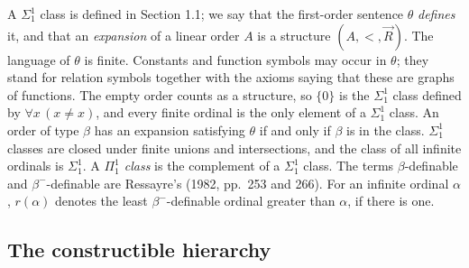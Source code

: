 \documentclass[11pt]{article}
\begin{document}
A $\Sigma^1_1$ class is defined in Section 1.1; we say that the first-order sentence $\theta$ \emph{defines} it, and
that an \emph{expansion} of a linear order $A$ is a structure $(A, <, \vec R)$. The language of $\theta$ is finite.
Constants and function symbols may occur in $\theta$; they stand for relation symbols together with the axioms saying
that these are graphs of functions. The empty order counts as a structure, so $\{0\}$ is the $\Sigma^1_1$ class
defined by $\forall x\, (x \ne x)$, and every finite ordinal is the only element of a $\Sigma^1_1$ class. An order of type $\beta$ has an
expansion satisfying $\theta$ if and only if $\beta$ is in the class. $\Sigma^1_1$ classes are closed under finite
unions and intersections, and the class of all infinite ordinals is $\Sigma^1_1$. A \emph{$\Pi^1_1$ class} is the
complement of a $\Sigma^1_1$ class. The terms $\beta$-definable and $\beta^-$-definable are Ressayre's (1982,
pp.\ 253 and 266). For an infinite ordinal $\alpha$, $r(\alpha)$ denotes the least $\beta^-$-definable ordinal
greater than $\alpha$, if there is one.

\subsection{The constructible hierarchy}
\end{document}
